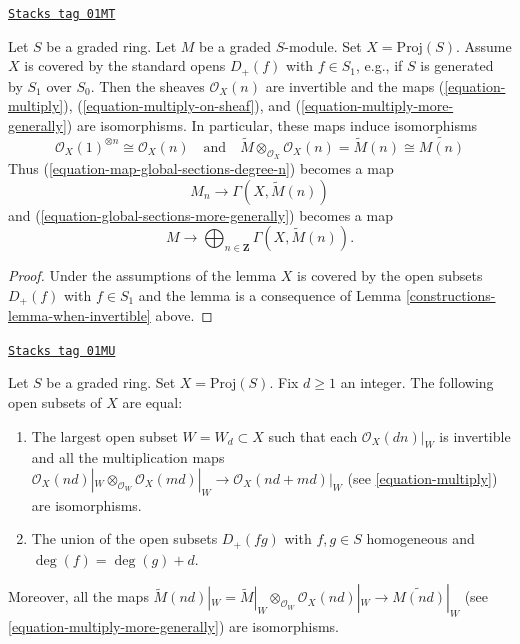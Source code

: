 \begin{lemma}
\label{constructions-lemma-apply-modules}
\href{https://stacks.math.columbia.edu/tag/01MT}{\texttt{Stacks tag 01MT}}

Let $S$ be a graded ring. Let $M$ be a graded $S$-module.
Set $X = \text{Proj}(S)$. Assume $X$ is covered by the standard
opens $D_+(f)$ with $f \in S_1$, e.g., if $S$ is generated by $S_1$
over $S_0$. Then the sheaves $\mathcal{O}_X(n)$
are invertible and the maps
(\ref{equation-multiply}), (\ref{equation-multiply-on-sheaf}), and
(\ref{equation-multiply-more-generally}) are isomorphisms.
In particular, these maps induce isomorphisms
$$
\mathcal{O}_X(1)^{\otimes n} \cong
\mathcal{O}_X(n)
\quad
\text{and}
\quad
\widetilde{M} \otimes_{\mathcal{O}_X} \mathcal{O}_X(n) =
\widetilde{M}(n) \cong \widetilde{M(n)}
$$
Thus (\ref{equation-map-global-sections-degree-n}) becomes a map
\begin{equation}
\label{equation-map-global-sections-degree-n-simplified}
M_n \longrightarrow \Gamma(X, \widetilde{M}(n))
\end{equation}
and (\ref{equation-global-sections-more-generally}) becomes a map
\begin{equation}
\label{equation-global-sections-more-generally-simplified}
M \longrightarrow
\bigoplus\nolimits_{n \in \mathbf{Z}} \Gamma(X, \widetilde{M}(n)).
\end{equation}
\end{lemma}

\begin{proof}

Under the assumptions of the lemma $X$ is covered by the
open subsets $D_{+}(f)$ with $f \in S_1$ and the
lemma is a consequence of Lemma \ref{constructions-lemma-when-invertible} above.
\end{proof}

\begin{lemma}
\label{constructions-lemma-where-invertible}
\href{https://stacks.math.columbia.edu/tag/01MU}{\texttt{Stacks tag 01MU}}

Let $S$ be a graded ring. Set $X = \text{Proj}(S)$. Fix $d \geq 1$ an
integer. The following open subsets of $X$ are equal:
\begin{enumerate}
\item The largest open subset $W = W_d \subset X$ such that
each $\mathcal{O}_X(dn)|_W$ is invertible and all the
multiplication maps
$\mathcal{O}_X(nd)|_W \otimes_{\mathcal{O}_W} \mathcal{O}_X(md)|_W
\to \mathcal{O}_X(nd + md)|_W$
(see \ref{equation-multiply}) are isomorphisms.
\item The union of the open subsets $D_{+}(fg)$ with
$f, g \in S$ homogeneous and $\deg(f) = \deg(g) + d$.
\end{enumerate}
Moreover, all the maps
$\widetilde M(nd)|_W = \widetilde M|_W \otimes_{\mathcal{O}_W}
\mathcal{O}_X(nd)|_W \to \widetilde{M(nd)}|_W$
(see \ref{equation-multiply-more-generally}) are isomorphisms.
\end{lemma}

